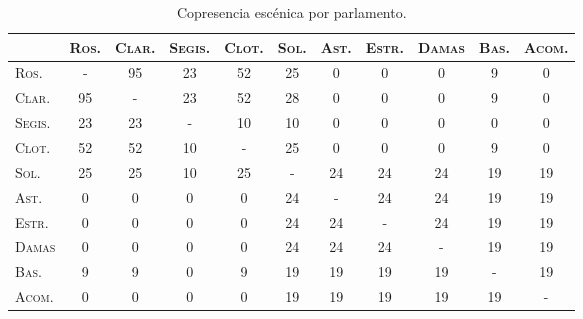 \begin{table}[!ht]
	\centering\small
	\begin{tabular}{lcccccccccc}
		\toprule
 &\textsc{Ros.}& \textsc{Clar.}&\textsc{Segis.}&\textsc{Clot.}&\textsc{Sol.}&\textsc{Ast.}&\textsc{Estr.}&\textsc{Damas}&\textsc{Bas.}&\textsc{Acom.}\\\midrule
\textsc{Ros.}&-&95&23&52&25&0&0&0&9&0\\
\textsc{Clar.}&95&-&23&52&28&0&0&0&9&0\\
\textsc{Segis.}&23&23&-&10&10&0&0&0&0&0\\
\textsc{Clot.}&52&52&10&-&25&0&0&0&9&0\\
\textsc{Sol.} &25&25&10&25&-&24&24&24&19&19\\
\textsc{Ast.} &0&0&0&0&24&-&24&24&19&19\\
\textsc{Estr.}&0&0&0&0&24&24&-&24&19&19\\
\textsc{Damas}&0&0&0&0&24&24&24&-&19&19\\
\textsc{Bas.}&9&9&0&9&19&19&19&19&-&19\\
\textsc{Acom.}&0&0&0&0&19&19&19&19&19&-\\
		\bottomrule
	\end{tabular}
	\caption{Copresencia escénica por parlamento.}
	\label{tab:drama}
\end{table}
